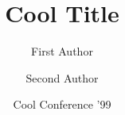 \documentclass[11pt]{beamer}
\author{%
  First Author\inst{1}
  \and Second Author\inst{2}
}
\institute{
  \inst{1}%
  Some University\\
  \inst{2}%
  Some Company
}
\title{Cool Title}
\date{Cool Conference '99}
\begin{document}
\begin{frame}[plain]
  \maketitle
\end{frame}
\end{document}
